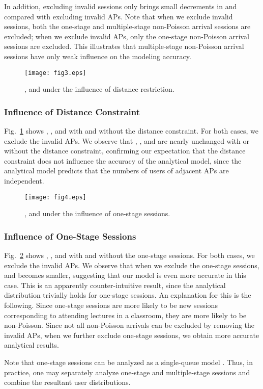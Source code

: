 In addition, excluding invalid sessions only brings small decrements in  and  compared with excluding invalid APs. Note that when we exclude invalid sessions, both the one-stage and multiple-stage non-Poisson arrival sessions are excluded; when we exclude invalid APs, only the one-stage non-Poisson arrival sessions are excluded. This illustrates that multiple-stage non-Poisson arrival sessions have only weak influence on the modeling accuracy.




\begin{figure}[tbp]
\centering
\texttt{[image: fig3.eps]}
\caption{,  and  under the influence of distance restriction.}
\label{result3}
\end{figure}


\subsubsection{Influence of Distance Constraint}
Fig.~\ref{result3} shows , , and  with and without the distance constraint. For both cases, we exclude the invalid APs.  We observe that , , and  are nearly unchanged with or without the distance constraint, confirming our expectation that the distance constraint does not influence the accuracy of the analytical model, since the analytical model predicts that the numbers of users of adjacent APs are independent.


\begin{figure}[tbp]
\centering
\texttt{[image: fig4.eps]}
\caption{,  and  under the influence of one-stage sessions.}
\label{result4}
\end{figure}

\subsubsection{Influence of One-Stage Sessions}
Fig.~\ref{result4} shows , , and  with and without the one-stage sessions. For both cases, we exclude the invalid APs.
We observe that when we exclude the one-stage sessions,  and  becomes smaller, suggesting that our model is even more accurate in this case.  This is an apparently counter-intuitive result, since the analytical distribution trivially holds for one-stage sessions.  An explanation for this is the following. Since one-stage sessions are more likely to be new sessions corresponding to attending lectures in a classroom, they are more likely to be non-Poisson.  Since not all non-Poisson arrivals can be excluded by removing the invalid APs, when we further exclude one-stage sessions, we obtain more accurate analytical results.



Note that one-stage sessions can be analyzed as a single-queue model \cite{Mobility-Core4}. Thus, in practice, one may separately analyze one-stage and multiple-stage sessions and combine the resultant user distributions.


